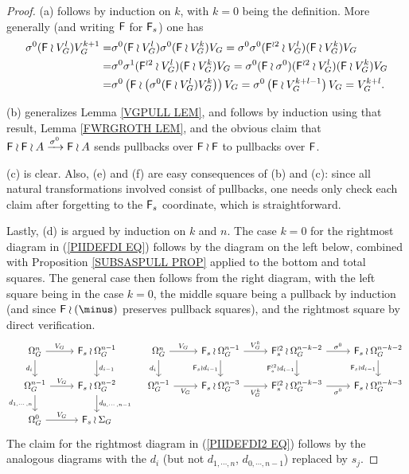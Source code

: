 \documentclass[a4paper,10pt]{article}%
\begin{document}
\begin{proof}
(a) follows by induction on $k$, with $k=0$ being the definition. More generally (and writing $\mathsf{F}$ for $\mathsf{F}_s$)
one has
\begin{align*}
	\sigma^0(\mathsf{F} \wr V_G^l)V_G^{k+1}= &
	\sigma^0(\mathsf{F} \wr V_G^l)\sigma^0 (\mathsf{F} \wr V_G^k) V_G =
	\sigma^0 \sigma^0 (\mathsf{F}^{\wr 2} \wr V_G^l)(\mathsf{F} \wr V_G^k) V_G
\\
	= & \sigma^0 \sigma^1 (\mathsf{F}^{\wr 2} \wr V_G^l)(\mathsf{F} \wr V_G^k) V_G =
	\sigma^0 (\mathsf{F} \wr \sigma^0)  (\mathsf{F}^{\wr 2} \wr V_G^l)(\mathsf{F} \wr V_G^k) V_G 
\\
	= & \sigma^0 \left(\mathsf{F} \wr \left( \sigma^0 (\mathsf{F} \wr V_G^l) V_G^k \right)\right) V_G = \sigma^0 \left(\mathsf{F} \wr V_G^{k+l-1}\right) V_G =
V_G^{k+l}.
\end{align*}

(b) generalizes Lemma \ref{VGPULL LEM}, and follows by induction using that result, Lemma \ref{FWRGROTH LEM},
and the obvious claim that $\mathsf{F} \wr \mathsf{F} \wr A \xrightarrow{\sigma^0} \mathsf{F} \wr A$ sends pullbacks over $\mathsf{F} \wr \mathsf{F}$ to pullbacks over $\mathsf{F}$.

(c) is clear. Also, (e) and (f) are easy consequences of (b) and (c): since all natural transformations involved consist of pullbacks, one needs only check each claim after forgetting to the $\mathsf{F}_s$ coordinate, which is straightforward.

Lastly, (d) is argued by induction on $k$ and $n$. The case $k=0$ for the rightmost diagram in (\ref{PIIDEFDI EQ}) follows by the diagram on the left below, combined with
Proposition \ref{SUBSASPULL PROP} applied to the bottom and total squares. The general case then follows from the right diagram, with the left square being in the case $k=0$, the middle square being a pullback by induction (and since $\Fin \wr (\minus)$ preserves pullback squares), and the rightmost square by direct verification.
\begin{equation}
\begin{tikzcd}[row sep=1.7em,column sep = 2.5em]
	\Omega_{G}^{n} \ar{d}[swap]{d_{i}} \ar{r}{V_G} &
	\Fin_s \wr \Omega_{G}^{n-1}
	\ar{d}{d_{i-1}} &
	\Omega_G^n \ar{r}{V_G} \ar{d}[swap]{d_i} &
	\Fin_s \wr \Omega_G^{n-1} \ar{r}{V_G^k} \ar{d}[swap]{\Fin_s \wr d_{i-1}} &
	\Fin_s^{\wr 2} \wr \Omega_G^{n-k-2} \ar{r}{\sigma^0} \ar{d}[swap]{\Fin_s^{\wr 2} \wr d_{i-1}}  &
	\Fin_s \wr \Omega_G^{n-k-2} \ar{d}[swap]{\Fin_s \wr d_{i-1}}
\\
	\Omega_{G}^{n-1} \ar{d}[swap]{d_{1,\cdots,n}} \ar{r}{V_G} &
	\Fin_s \wr \Omega_{G}^{n-2}
	\ar{d}{d_{0,\cdots,n-1}}  &
	\Omega_G^{n-1} \ar{r}[swap]{V_G} &
	\Fin_s \wr \Omega_G^{n-3} \ar{r}[swap]{V_G^k} &
	\Fin_s^{\wr 2} \wr \Omega_G^{n-k-3} \ar{r}[swap]{\sigma^0} &
	\Fin_s \wr \Omega_G^{n-k-3}
\\
	\Omega_{G}^{0} \ar{r}{V_G}&
	\Fin_s \wr \Sigma_G 
\end{tikzcd}
\end{equation}
The claim for the rightmost diagram in (\ref{PIIDEFDI2 EQ}) follows by the analogous diagrams with the $d_i$ (but not $d_{1,\cdots,n}$, 
$d_{0,\cdots,n-1}$) replaced by $s_j$.
\end{proof}
\end{document}
